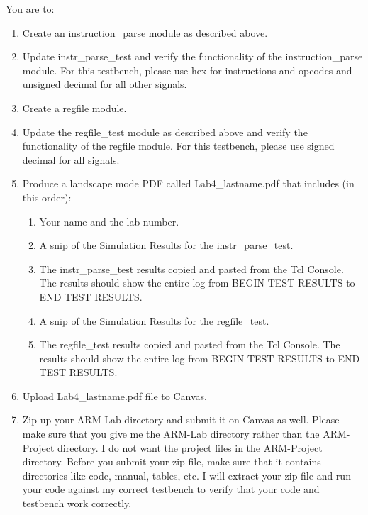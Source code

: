 You are to:
\begin{enumerate}
\item Create an instruction\_parse module as described above.
\item Update instr\_parse\_test and verify the functionality of the instruction\_parse module.  For this testbench, please use hex for instructions and opcodes and unsigned decimal for all other signals.
\item Create a regfile module.
\item Update the regfile\_test module as described above and verify the functionality of the regfile module.  For this testbench, please use signed decimal for all signals.
\item Produce a landscape mode PDF called Lab4\_lastname.pdf that includes (in this order):
\begin{enumerate}
	\item Your name and the lab number.
	\item A snip of the Simulation Results for the instr\_parse\_test.  
	\item The instr\_parse\_test results copied and pasted from the Tcl Console.  The results should show the entire log from BEGIN TEST RESULTS to END TEST RESULTS.
	\item A snip of the Simulation Results for the regfile\_test.    
	\item The regfile\_test results copied and pasted from the Tcl Console.  The results should show the entire log from BEGIN TEST RESULTS to END TEST RESULTS.
\end{enumerate}
\item Upload Lab4\_lastname.pdf file to Canvas.
\item Zip up your ARM-Lab directory and submit it on Canvas as well.  Please make sure that you give me the ARM-Lab directory rather than the ARM-Project directory.  I do not want the project files in the ARM-Project directory.  Before you submit your zip file, make sure that it contains directories like code, manual, tables, etc.  I will extract your zip file and run your code against my correct testbench to verify that your code and testbench work correctly.
\end{enumerate} 